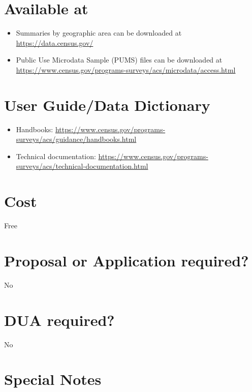 \documentclass[
]{book}
\providecommand{\tightlist}{%
  \setlength{\itemsep}{0pt}\setlength{\parskip}{0pt}}
\begin{document}
\hypertarget{available-at-5}{%
\section{Available at}\label{available-at-5}}

\begin{itemize}
\tightlist
\item
  Summaries by geographic area can be downloaded at \url{https://data.census.gov/}
\item
  Public Use Microdata Sample (PUMS) files can be downloaded at \url{https://www.census.gov/programs-surveys/acs/microdata/access.html}
\end{itemize}

\hypertarget{user-guidedata-dictionary-5}{%
\section{User Guide/Data Dictionary}\label{user-guidedata-dictionary-5}}

\begin{itemize}
\tightlist
\item
  Handbooks: \url{https://www.census.gov/programs-surveys/acs/guidance/handbooks.html}
\item
  Technical documentation: \url{https://www.census.gov/programs-surveys/acs/technical-documentation.html}
\end{itemize}

\hypertarget{cost-5}{%
\section{Cost}\label{cost-5}}

Free

\hypertarget{proposal-or-application-required-5}{%
\section{Proposal or Application required?}\label{proposal-or-application-required-5}}

No

\hypertarget{dua-required-5}{%
\section{DUA required?}\label{dua-required-5}}

No

\hypertarget{special-notes-5}{%
\section{Special Notes}\label{special-notes-5}}
\end{document}
